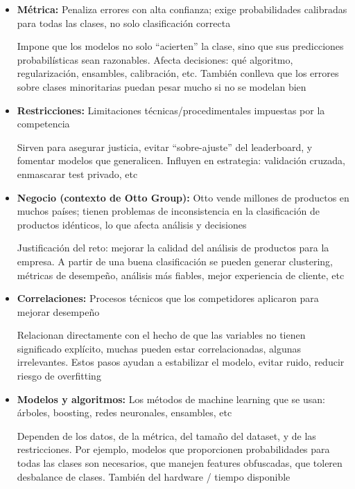 \documentclass[12pt]{article}%
\begin{document}
\begin{itemize}
    \item \textbf{Métrica: }Penaliza errores con alta confianza; exige probabilidades calibradas para todas las clases, no solo clasificación correcta

    Impone que los modelos no solo “acierten” la clase, sino que sus predicciones probabilísticas sean razonables. Afecta decisiones: qué algoritmo, regularización, ensambles, calibración, etc. También conlleva que los errores sobre clases minoritarias puedan pesar mucho si no se modelan bien

    \item \textbf{Restricciones: }Limitaciones técnicas/procedimentales impuestas por la competencia

    Sirven para asegurar justicia, evitar “sobre-ajuste” del leaderboard, y fomentar modelos que generalicen. Influyen en estrategia: validación cruzada, enmascarar test privado, etc

    \item \textbf{Negocio (contexto de Otto Group): }Otto vende millones de productos en muchos países; tienen problemas de inconsistencia en la clasificación de productos idénticos, lo que afecta análisis y decisiones

    Justificación del reto: mejorar la calidad del análisis de productos para la empresa. A partir de una buena clasificación se pueden generar clustering, métricas de desempeño, análisis más fiables, mejor experiencia de cliente, etc

    \item \textbf{Correlaciones: }Procesos técnicos que los competidores aplicaron para mejorar desempeño

    Relacionan directamente con el hecho de que las variables no tienen significado explícito, muchas pueden estar correlacionadas, algunas irrelevantes. Estos pasos ayudan a estabilizar el modelo, evitar ruido, reducir riesgo de overfitting

    \item \textbf{Modelos y algoritmos: }Los métodos de machine learning que se usan: árboles, boosting, redes neuronales, ensambles, etc

    Dependen de los datos, de la métrica, del tamaño del dataset, y de las restricciones. Por ejemplo, modelos que proporcionen probabilidades para todas las clases son necesarios, que manejen features obfuscadas, que toleren desbalance de clases. También del hardware / tiempo disponible
    
\end{itemize}
\end{document}

